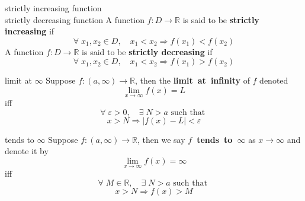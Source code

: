 \documentclass[avery5371,grid]{flashcards}
\newcommand{\R}{\mathbb{R}}
\newcommand{\st}{\textrm{ such that }}
\begin{document}

\begin{flashcard}[Definition]{strictly increasing function \\
strictly decreasing function}
A function $f:D\rightarrow \R$ is said to be
\textbf{strictly increasing} if
\begin{equation*}
\forall \; x_1,x_2 \in D, \quad x_1 < x_2 \Rightarrow f(x_1) < f(x_2)
\end{equation*}
A function $f:D\rightarrow \R$ is said to be
\textbf{strictly decreasing} if
\begin{equation*}
\forall \; x_1,x_2 \in D, \quad x_1 < x_2 \Rightarrow f(x_1) > f(x_2)
\end{equation*}
\end{flashcard}


\begin{flashcard}[Definition]{limit at $\infty$}
Suppose $f:(a,\infty)\rightarrow \R$, then the
\mbox{\textbf{limit at infinity}} of $f$ denoted 
\begin{equation*}
\lim_{x\rightarrow \infty} f(x) = L
\end{equation*}
iff 
\begin{equation*}
\forall \; \varepsilon >0, \quad \exists \; N>a \st
\end{equation*}
\begin{equation*}
x>N \Rightarrow |f(x) - L| < \varepsilon
\end{equation*}
\end{flashcard}

\begin{flashcard}[Definition]{tends to $\infty$}
Suppose $f:(a,\infty)\rightarrow \R$, then we say
\mbox{\textbf{$f$ tends to $\infty$}} as $x\rightarrow \infty$ and
denote it by 
\begin{equation*}
\lim_{x\rightarrow \infty} f(x) = \infty
\end{equation*}
iff 
\begin{equation*}
\forall \; M \in \R , \quad \exists \; N>a \st
\end{equation*}
\begin{equation*}
x>N \Rightarrow f(x) > M
\end{equation*}
\end{flashcard}
\end{document}

